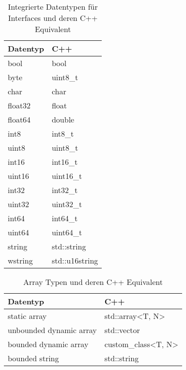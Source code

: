 \begin{table}[ht]
    \centering
    \caption{Integrierte Datentypen für Interfaces und deren C++ Equivalent}
\begin{tabular}{l|l}
\hline
\textbf{Datentyp} & \textbf{C++}   \\ \hline
bool         & bool           \\ \hline
byte         & uint8\_t       \\ \hline
char         & char           \\ \hline
float32      & float          \\ \hline
float64      & double         \\ \hline
int8         & int8\_t        \\ \hline
uint8        & uint8\_t       \\ \hline
int16        & int16\_t       \\ \hline
uint16       & uint16\_t      \\ \hline
int32        & int32\_t       \\ \hline
uint32       & uint32\_t      \\ \hline
int64        & int64\_t       \\ \hline
uint64       & uint64\_t      \\ \hline
string       & std::string    \\ \hline
wstring      & std::u16string \\ \hline
\end{tabular}
    \label{tab:builtintypes}
\end{table}
\begin{table}[ht]
    \centering
    \caption{Array Typen und deren C++ Equivalent}
\begin{tabular}{|l|l|}
\hline
\textbf{Datentyp} & \textbf{C++}   \\ \hline
static array               & std::array<T, N>   \\ \hline
unbounded dynamic array    & std::vector        \\ \hline
bounded dynamic array      & custom\_class<T, N> \\ \hline
bounded string             & std::string        \\ \hline
\end{tabular}
    \label{tab:arraytypes}
\end{table}

